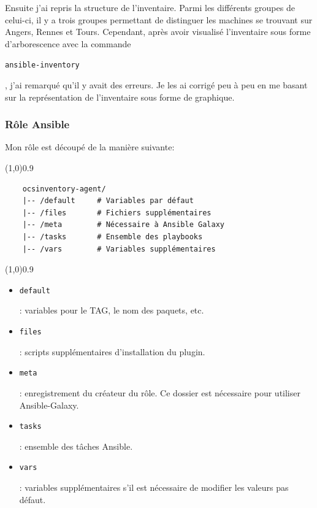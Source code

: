 \documentclass[12pt, a4paper, twoside]{article}
\begin{document}
Ensuite j'ai repris la structure de l'inventaire. 
Parmi les différents groupes de celui-ci, il y a trois groupes permettant de distinguer les machines se trouvant sur Angers, Rennes et Tours. 
Cependant, après avoir visualisé l'inventaire sous forme d'arborescence avec la commande \begin{code}\texttt{ansible-inventory}\end{code}, j'ai remarqué qu'il y avait des erreurs. 
Je les ai corrigé peu à peu en me basant sur la représentation de l'inventaire sous forme de graphique.

\subsubsection{Rôle Ansible}
Mon rôle est découpé de la manière suivante:
\vspace{-1ex}
\begin{code}
\vspace{-1ex}
\begin{center} 
    \line(1,0){0.9\textwidth} 
\end{center}
\vspace{-1ex}
\begin{verbatim}
    ocsinventory-agent/
    |-- /default     # Variables par défaut
    |-- /files       # Fichiers supplémentaires
    |-- /meta        # Nécessaire à Ansible Galaxy
    |-- /tasks       # Ensemble des playbooks
    |-- /vars        # Variables supplémentaires
\end{verbatim}
\vspace{-1ex}
\begin{center} 
    \line(1,0){0.9\textwidth} 
\end{center}
\vspace{-1ex}
\end{code}

\begin{itemize}
    \item \begin{code}\texttt{default}\end{code}: variables pour le TAG, le nom des paquets, etc.
    \item \begin{code}\texttt{files}\end{code}: scripts supplémentaires d'installation du plugin.
    \item \begin{code}\texttt{meta}\end{code}: enregistrement du créateur du rôle. Ce dossier est nécessaire pour utiliser \gls{Ansible}-Galaxy.
    \item \begin{code}\texttt{tasks}\end{code}: ensemble des tâches \gls{Ansible}.
    \item \begin{code}\texttt{vars}\end{code}: variables supplémentaires s'il est nécessaire de modifier les valeurs pas défaut.
\end{itemize}
\end{document}
